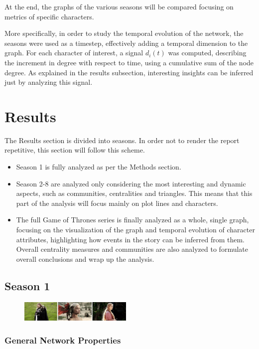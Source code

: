 \documentclass[10pt,twocolumn,letterpaper]{article}
\begin{document}
At the end, the graphs of the various seasons will be compared focusing on metrics of specific characters.

More specifically, in order to study the temporal evolution of the network, the seasons were used as a timestep, effectively adding a temporal dimension to the graph. For each character of interest, a signal $d_i(t)$ was computed, describing the increment in degree with respect to time, using a cumulative sum of the node degree. As explained in the results subsection, interesting insights can be inferred just by analyzing this signal.

\section{Results}

The Results section is divided into seasons. In order not to render the report repetitive, this section will follow this scheme.

\begin{itemize}
    \item Season 1 is fully analyzed as per the Methods section.
    \item Season 2-8 are analyzed only considering the most interesting and dynamic aspects, such as communities, centralities and triangles. This means that this part of the analysis will focus mainly on plot lines and characters. 
    \item The full Game of Thrones series is finally analyzed as a whole, single graph, focusing on the visualization of the graph and temporal evolution of character attributes, highlighting how events in the story can be inferred from them. Overall centrality measures and communities are also analyzed to formulate overall conclusions and wrap up the analysis.
\end{itemize}

\subsection{Season 1}

\begin{figure}[!h]
    \centering
    \includegraphics[width=0.48\textwidth]{img/s1/frames_s1.jpg}
\end{figure}


\subsubsection{General Network Properties}
\end{document}
